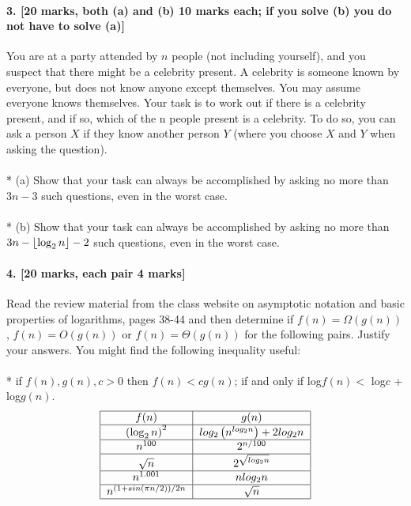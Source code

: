\documentclass[a4paper]{scrartcl}
\begin{document}
\paragraph{3. [20 marks, both (a) and (b) 10 marks each; if you solve (b) you do not have to
solve (a)]}
\label{sec:Question 3}
You are at a party attended by $n$ people (not including yourself), and you suspect that there might be a celebrity present. A celebrity is someone known by everyone, but does not know anyone except themselves. You may assume everyone knows themselves. Your task is to work out if there is a celebrity present, and if so, which of the n people present is a celebrity. To do so, you can ask a person $X$ if they know another person $Y$ (where you choose $X$ and $Y$ when asking the question).\\
\\*
(a) Show that your task can always be accomplished by asking no more than $3n-3$ such questions, even in the worst case.\\
\\*
(b) Show that your task can always be accomplished by asking no more than $3n-\left\lfloor \log_2{n} \right\rfloor-2$ such questions, even in the worst case.

\paragraph{4. [20 marks, each pair 4 marks]}
\label{sec:Question 4}
Read the review material from the class website on asymptotic notation and basic properties of logarithms, pages 38-44 and then determine if $f(n) = \Omega(g(n))$, $f(n) = O(g(n))$ or $f (n) = \Theta(g(n))$ for the following pairs. Justify your answers. You might find the following inequality useful: \\
\\*
if $f (n), g(n), c > 0$ then $f (n) < c g(n)$; if and only if log$f(n) <$ log$c$ + log$g(n)$.
\begin{align*}
\begin{tabular}{|c | c |}
  \hline
  $f(n)$ & $g(n)$ \\
  \hline
  $\left(\log_2n\right)^2$ & $log_2\left(n^{log_2{n}}\right) + 2 log_2n$ \\
  \hline
  $n^{100}$ & $2^{n/100}$ \\
  \hline
  $\sqrt{n}$ & $2^{\sqrt{log_2 n}}$\\
    \hline
  $n^{1.001}$ & $n log_2 n$\\
  \hline
  $n^{(1+sin(\pi n/2))/2n}$ &  $\sqrt{n}$\\
  \hline
\end{tabular}
\end{align*}
\end{document}
